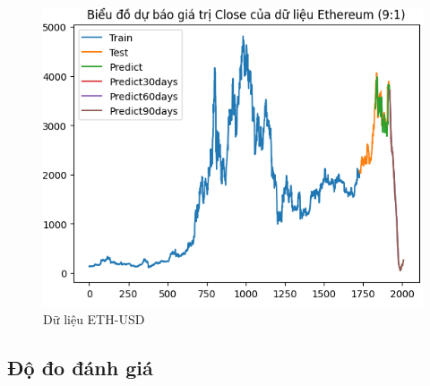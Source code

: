\documentclass[conference]{IEEEtran}
\begin{document}
\begin{figure}[H]
\begin{minipage}{0.15\textwidth}
    \includegraphics[width=1\textwidth]{Figure/ETH91.png}
    \end{minipage}
    \caption{Dữ liệu ETH-USD}
    \label{fig:1}
\end{figure}

\subsection{Độ đo đánh giá}
\end{document}
